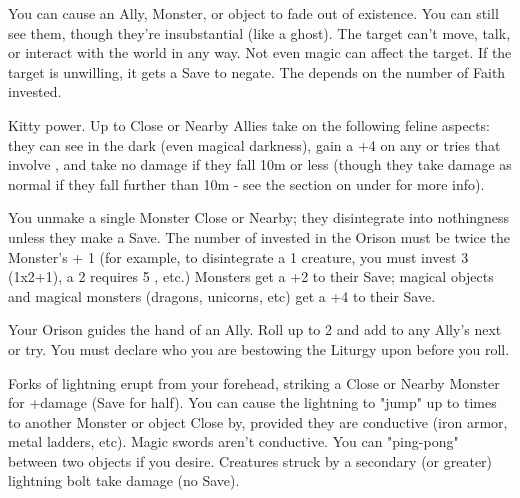 \begin{multicols*}{2}
\LITURGY [
  Name = Fade,
  Link = arcana-mystery-fade,
  Paradigm = Cthonic,
  Duration=1 Combat Action
]

You can cause an Ally, Monster, or object to fade out of existence.  You can still see them, though they're insubstantial (like a ghost).  The target can't move, talk, or interact with the world in any way.  Not even magic can affect the target.  If the target is unwilling, it gets a Save to negate.  The \Duration depends on the number of Faith invested.

\LITURGY [
  Name = Feline Ease,
  Link = arcana-mystery-feline-ease,
  Paradigm = Monstrous,
  Duration=1 Combat Action
]

Kitty power. Up to \DICE Close or Nearby Allies take on the following feline aspects: they can see in the dark (even magical darkness), gain a +4 on any \RO or \RB tries that involve \DEX, and take no damage if they fall 10m or less (though they take damage as normal if they fall further than 10m - see the section on  under  for more info).

\newpage

\LITURGY [
  Name = Gaze of the Void,
  Link = arcana-mystery-gaze-of-the-void,
  Paradigm = Ruinous,
  Duration=1 Combat Action
]

You unmake a single Monster Close or Nearby; they disintegrate into nothingness unless they make a Save. The number of \DICE invested in the Orison must be twice the Monster's \HD + 1 (for example, to disintegrate a 1 \HD creature, you must invest 3 \DICE (1x2+1), a 2 \HD requires 5 \DICE, etc.) Monsters get a +2 to their Save; magical objects and magical monsters (dragons, unicorns, etc) get a +4 to their Save.

\LITURGY [
  Name = Hand of God,
  Link = arcana-mystery-hand-of-god,
  Paradigm = Errant,
  Duration=1 Combat Action
]

Your Orison guides the hand of an Ally. Roll up to 2 \DICE and add \SUMDICE to any Ally's next \VIG or \DEX try. You must declare who you are bestowing the Liturgy upon before you roll.


\cbreak

\LITURGY [
  Name = Lightning,
  Link = arcana-mystery-lightning,
  Paradigm = Empyrean,
  Duration=1 Combat Action
]

Forks of lightning erupt from your forehead, striking a Close or Nearby Monster for \SUMDICE+\DICE damage (Save for half). You can cause the lightning to "jump" up to  times to another Monster or object Close by, provided they are conductive (iron armor, metal ladders, etc).  Magic swords aren't conductive.  You can "ping-pong" between two objects if you desire. Creatures struck by a secondary (or greater) lightning bolt take \DICE damage (no Save). 


\end{multicols*}
